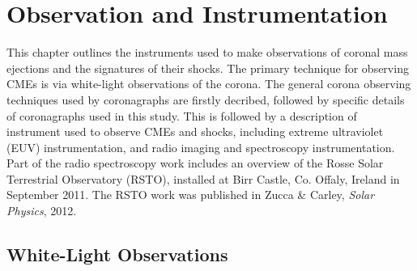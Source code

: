 
\singlespacing
\chapter{Observation and Instrumentation} 
\label{chap:3}
\doublespacing
This chapter outlines the instruments used to make observations of coronal mass ejections and the signatures of their shocks. The primary technique for observing CMEs is via white-light observations of the corona. The general corona observing techniques used by coronagraphs are firstly decribed, followed by specific details of coronagraphs used in this study. This is followed by a description of instrument used to observe CMEs and shocks, including extreme ultraviolet (EUV) instrumentation, and radio imaging and spectroscopy instrumentation. Part of the radio spectroscopy work includes an overview of the Rosse Solar Terrestrial Observatory (RSTO), installed at Birr Castle, Co. Offaly, Ireland in September 2011. The RSTO work was published in Zucca \& Carley, {\it Solar Physics}, 2012.
\clearpage

\section{White-Light Observations}\label{sec:1}

